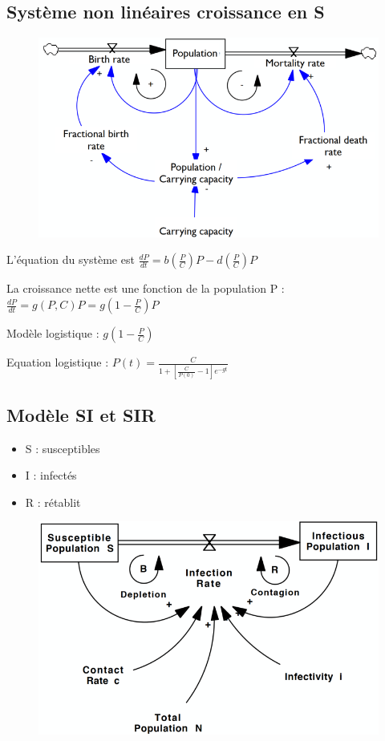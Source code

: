 \documentclass[resume]{subfiles}
\begin{document}
\subsection{Système non linéaires croissance en S}

\begin{figure}[H]
    \centering
    \includegraphics[width=1\columnwidth]{Figures/FDM_3.png}
\end{figure}

L'équation du système est $\frac{dP}{dt}=b(\frac{P}{C})P-d(\frac{P}{C})P$  

La croissance nette est une fonction de la population P : $\frac{dP}{dt}=g(P,C)P=g(1-\frac{P}{C})P$ 

Modèle logistique : $g(1-\frac{P}{C})$ 

Equation logistique : $P(t)= \frac{C}{1+[\frac{C}{P(0)}-1]e^{-gt}}$ 

\subsection{Modèle SI et SIR}
\begin{itemize}
\item S : susceptibles
\item I : infectés
\item R : rétablit
\end{itemize}

\begin{figure}[H]
    \centering
    \includegraphics[width=1\columnwidth]{Figures/SI_1.png}
\end{figure}
\end{document}
